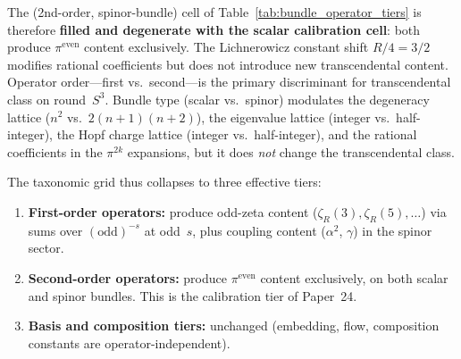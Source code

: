 The (2nd-order, spinor-bundle) cell of Table~\ref{tab:bundle_operator_tiers}
is therefore \textbf{filled and degenerate with the scalar calibration
cell}: both produce $\pi^{\text{even}}$ content exclusively.  The
Lichnerowicz constant shift $R/4 = 3/2$ modifies rational coefficients
but does not introduce new transcendental content.  Operator order---first
vs.\ second---is the primary discriminant for transcendental class on
round~$S^3$.  Bundle type (scalar vs.\ spinor) modulates the
degeneracy lattice ($n^2$ vs.\ $2(n+1)(n+2)$), the eigenvalue lattice
(integer vs.\ half-integer), the Hopf charge lattice (integer vs.\
half-integer), and the rational coefficients in the $\pi^{2k}$
expansions, but it does \emph{not} change the transcendental class.

The taxonomic grid thus collapses to three effective tiers:
\begin{enumerate}
  \item \textbf{First-order operators:} produce odd-zeta content
    ($\zeta_R(3), \zeta_R(5), \ldots$) via sums over
    $(\text{odd})^{-s}$ at odd~$s$, plus coupling content ($\alpha^2$,
    $\gamma$) in the spinor sector.
  \item \textbf{Second-order operators:} produce $\pi^{\text{even}}$
    content exclusively, on both scalar and spinor bundles. This is the
    calibration tier of Paper~24.
  \item \textbf{Basis and composition tiers:} unchanged (embedding,
    flow, composition constants are operator-independent).
\end{enumerate}
